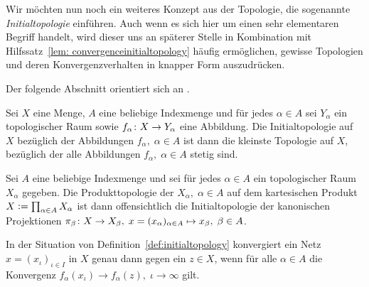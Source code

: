 \documentclass[../main/main.tex]{subfiles}
\begin{document}
	Wir möchten nun noch ein weiteres Konzept aus der Topologie, die sogenannte \emph{Initialtopologie} einführen.
	Auch wenn es sich hier um einen sehr elementaren Begriff handelt, wird dieser uns an späterer Stelle 
	in Kombination mit Hilfssatz~\ref{lem: convergenceinitialtopology} häufig ermöglichen, 
	gewisse Topologien und deren Konvergenzverhalten in knapper Form auszudrücken. 
	
	Der folgende Abschnitt orientiert sich an \cite[Kapitel 2.13]{Aliprantis.2006}.
	
	\begin{Definition}[Initialtopologie]
		\label{def:initialtopology}
		Sei $X$ eine Menge, $A$ eine beliebige Indexmenge und für jedes $\alpha \in A$ sei $Y_\alpha$ ein topologischer Raum sowie $f_\alpha \colon X \to Y_\alpha$ eine Abbildung.
		Die Initialtopologie auf $X$ bezüglich der Abbildungen $f_\alpha, \; \alpha \in A$ ist dann die kleinste Topologie auf $X$, bezüglich der alle Abbildungen 
		$f_\alpha, \; \alpha \in A$ stetig sind.
	\end{Definition}

	\begin{Bemerkung}[Produkttopologie]
		Sei $A$ eine beliebige Indexmenge und sei für jedes $\alpha \in A$ ein topologischer Raum $X_\alpha$ gegeben. Die Produkttopologie der $X_\alpha, \; \alpha \in A$
		auf dem kartesischen Produkt $X \vcentcolon = \prod_{\alpha \in A} X_\alpha$ ist dann offensichtlich die Initialtopologie der kanonischen Projektionen 
		$\pi_\beta \colon X \to X_\beta, \; x = (x_\alpha)_{\alpha \in A} \mapsto x_\beta , \; \beta \in A$.
	\end{Bemerkung}
	
	\begin{Hilfssatz}
		\label{lem: convergenceinitialtopology}
		In der Situation von Definition~\ref{def:initialtopology} konvergiert ein Netz $x = (x_\iota)_{\iota \in I}$ in $X$ genau dann gegen ein $z \in X$, wenn für alle $\alpha \in A$
		die Konvergenz $f_\alpha(x_\iota) \to f_\alpha(z), \; \iota \to \infty$ gilt.
	\end{Hilfssatz}
\end{document}
